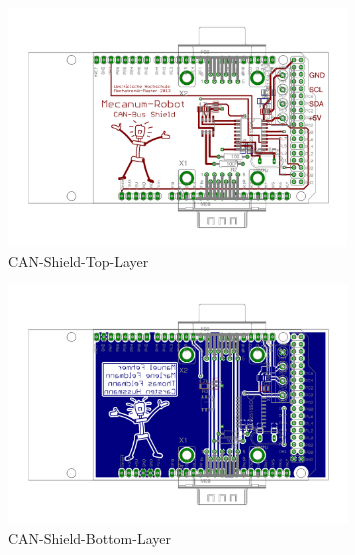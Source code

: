 \begin{figure}[H]
\centering
 \includegraphics[width=0.8\textwidth]{Abbildungen/CAN-Shield-Layout-Top} 
\caption[CAN-Shield-Top-Layer]{CAN-Shield-Top-Layer}
\label{fig:CAN-Shield-Layout-Top}
\end{figure}

\begin{figure}[H]
\centering
 \includegraphics[width=0.8\textwidth]{Abbildungen/CAN-Shield-Layout-Bottom} 
\caption[CAN-Shield-Bottom-Layer]{CAN-Shield-Bottom-Layer}
\label{fig:CAN-Shield-Layout-Bottom}
\end{figure}
